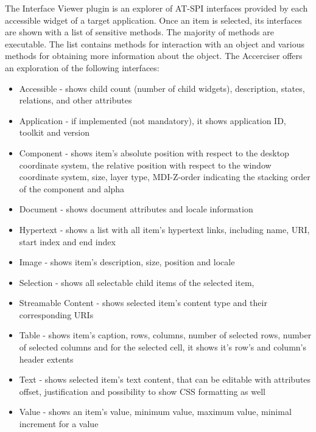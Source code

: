 The Interface Viewer plugin is an explorer of AT-SPI interfaces provided by each accessible widget of a target application. Once an item is selected, its interfaces are shown with a list of sensitive methods. The majority of methods are executable. The list contains methods for interaction with an object and various methods for obtaining more information about the object. The Accerciser offers an exploration of the following interfaces:
\begin{itemize}
    \item Accessible - shows child count (number of child widgets), description, states, relations, and other attributes
    \item Application - if implemented (not mandatory), it shows application ID, toolkit and version
    \item Component - shows item's absolute position with respect to the desktop coordinate system, the relative position with respect to the  window coordinate system, size, layer type, MDI-Z-order indicating the stacking order of the component and alpha
    \item Document - shows document attributes and locale information
    \item Hypertext - shows a list with all item's hypertext links,  including name, URI, start index and end index
    \item Image - shows item's description, size, position and locale
    \item Selection - shows all selectable child items of the selected item,
    \item Streamable Content - shows selected item's content type and their corresponding URIs
    \item Table - shows item's caption, rows, columns, number of selected rows, number of selected columns and for the selected cell, it shows  it's row's and column's header extents  
    \item Text - shows selected item's text content, that can be editable with attributes offset, justification  and possibility to show CSS formatting as well
    \item Value - shows an item's value, minimum value, maximum value, minimal increment for a value 
\end{itemize}

